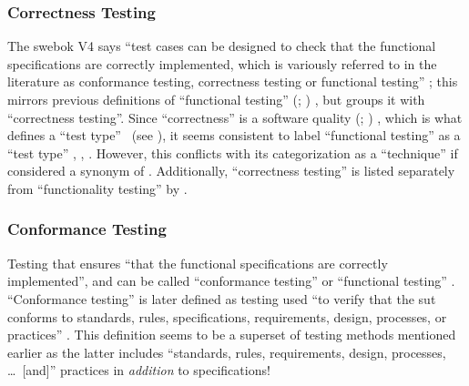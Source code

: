 \subsubsection{Correctness Testing}
\label{corr-func-test}
\ifnotpaper \citeauthor{SWEBOK2024} \else The \acs{swebok} V4 \fi says
``test cases can be designed to check that the functional
specifications are correctly implemented, which is variously
referred to in the literature as conformance testing, correctness
testing or functional testing'' \citeyearpar[p.~5-7]{SWEBOK2024};
this mirrors previous definitions
of ``functional testing'' \ifnotpaper (\citealp[p.~21]{IEEE2022};
    \citeyear[p.~196]{IEEE2017}) \else \cite[p.~196]{IEEE2017},
    \cite[p.~21]{IEEE2022} \fi but groups it with ``correctness
testing''. Since ``correctness'' is a software quality \ifnotpaper
    (\citealp[p.~104]{IEEE2017}; \citealp[p.~3-13]{SWEBOK2024}) \else
    \cite[p.~104]{IEEE2017}, \cite[p.~3-13]{SWEBOK2024} \fi which is
what defines a ``test type'' \citep[p.~15]{IEEE2022}\ifnotpaper\
    (see )\fi,
it seems consistent to label ``functional testing'' as a ``test type''
\ifnotpaper
    \citetext{\citealp[pp.~15,~20,~22]{IEEE2022};
        \citeyear[pp.~7,~38,~Tab.~A.1]{IEEE2021}; \citeyear[p.~4]{IEEE2016}}%
\else
    \cite[pp.~15,~20,~22]{IEEE2022}, \cite[pp.~7,~38,~Tab.~A.1]{IEEE2021},
    \cite[p.~4]{IEEE2016}\fi. However, this conflicts with its categorization
as a ``technique'' if considered a synonym of \nameref{spec-func-test}.
Additionally, ``correctness testing'' is listed separately from ``functionality
testing'' by \citet[p.~53]{Firesmith2015}.

\subsubsection{Conformance Testing}
Testing that ensures ``that the functional specifications are correctly
implemented'', and can be called ``conformance testing'' or ``functional
testing'' \citep[p.~5-7]{SWEBOK2024}.
``Conformance testing'' is later defined as testing used ``to
verify that the \acs{sut} conforms to standards, rules,
specifications, requirements, design, processes, or practices''
\citep[p.~5-7]{SWEBOK2024}. This definition seems to be a superset
of testing methods mentioned earlier as the latter includes ``standards,
rules, requirements, design, processes, \dots\ [and]'' practices in
\emph{addition} to specifications!

